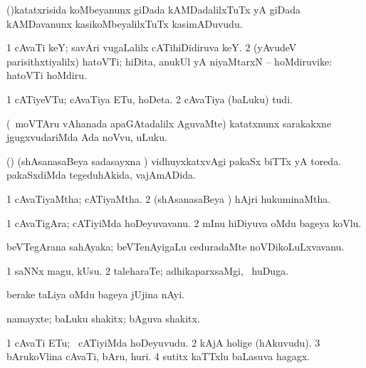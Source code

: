 {{{{{{\bentry
{} 
\gl{\nA}
\expl{}
\bmng
(\toV)katatxrisida koMbeyanunx giDada kAMDadalilxTuTx yA giDada kAMDavanunx kasikoMbeyalilxTuTx kasimADuvudu. 
\emng
\eentry

\bentry
{} 
\gl{\nA}
\expl{}
\bmng
\bnum
\num{1} cAvaTi keY; savAri \mo vugaLalilx cATihiDidiruva keY. 
\num{2} (yAvudeV parisithxtiyalilx) hatoVTi; hiDita, anukUl yA niyaMtarxN -- hoMdiruvike:  hatoVTi hoMdiru. 
\enum
\emng
\eentry

\bentry
{} 
\gl{\nA}
\expl{}
\bmng
\bnum
\num{1} cATiyeVTu; cAvaTiya ETu, hoDeta. 
\num{2} cAvaTiya (baLuku) tudi. 
\enum
\emng
\eentry

\bentry
{} 
\gl{\nA}
\expl{}
\bmng
(\kanmu\ moVTAru vAhanada apaGAtadalilx AguvaMte) katatxnunx sarakakxne jgugxvudariMda Ada noVvu, uLuku. 
\emng
\eentry

\bentry
{} 
\gl{\gu}
\expl{}
\bmng
(\birx) (shAsanasaBeya sadasayxna \vi) 
\banum
{} vidhuyxkatxvAgi pakaSx biTTx yA toreda. 
 pakaSxdiMda tegeduhAkida, vajAmADida. 
\eanum
\emng
\eentry

\bentry
{} 
\gl{\gu}
\expl{}
\bmng
\bnum
\num{1} cAvaTiyaMtha; cATiyaMtha. 
\num{2} (shAsanasaBeya \vi) hAjri hukuminaMtha. 
\enum
\emng
\eentry

\bentry
{} 
\gl{\nA}
\expl{}
\bmng
\bnum
\num{1} cAvaTigAra; cATiyiMda hoDeyuvavanu. 
\num{2} mInu hiDiyuva oMdu bageya koVlu. 
\enum
\emng
\eentry

\bentry
{} 
\gl{\nA}
\expl{}
\bmng
beVTegArana sahAyaka; beVTenAyigaLu ceduradaMte noVDikoLuLxvavanu. 
\emng
\eentry

\bentry
{} 
\gl{\nA}
\expl{}
\bmng
\bnum
\num{1} saNNx magu, kUsu. 
\num{2} taleharaTe; adhikaparxsaMgi, \kanmu\ huDuga. 
\enum
\emng
\eentry

\bentry
{} 
\gl{\nA}
\expl{}
\bmng
berake taLiya oMdu bageya jUjina nAyi. 
\emng
\eentry

\bentry
{} 
\gl{\nA}
\expl{}
\bmng
namayxte; baLuku shakitx; bAguva shakitx. 
\emng
\eentry

\bentry
{} 
\gl{\nA}
\expl{}
\bmng
\bnum
\num{1} cAvaTi ETu; \kanmu\ cATiyiMda hoDeyuvudu. 
\num{2} kAjA holige (hAkuvudu). 
\num{3} bArukoVlina cAvaTi, bAru, huri. 
\num{4} sutitx kaTTxlu baLasuva hagagx. 
\enum
\emng
\eentry

}}}}}}
